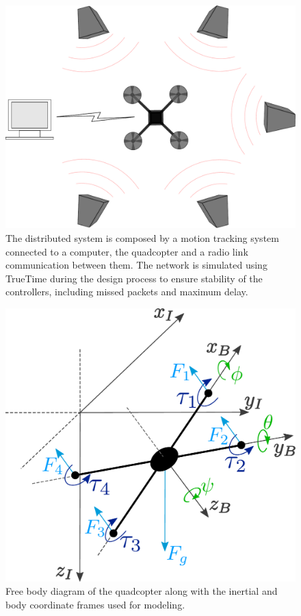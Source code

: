 \begin{figure}
\includegraphics[width=0.8\linewidth]{figures/system.pdf}
\caption{The distributed system is composed by a motion tracking system connected to a computer, the quadcopter and a radio link communication between them. The network is simulated using TrueTime during the design process to ensure stability of the controllers, including missed packets and maximum delay.}
\end{figure}
\vspace{0.2cm}
\begin{figure}
\includegraphics[width=0.8\linewidth]{figures/droneDiagram.pdf}
\caption{Free body diagram of the quadcopter along with the inertial and body coordinate frames used for modeling.}
\end{figure}